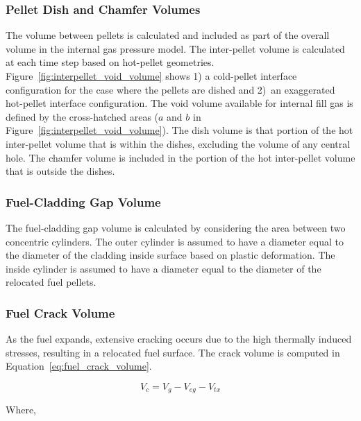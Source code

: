 \subsubsection{Pellet Dish and Chamfer Volumes} \label{section:pellet-dish-and-chamfer-volumes}

The volume between pellets is calculated and included as part of the overall volume in the internal
gas pressure model. The inter-pellet volume is calculated at each time step based on hot-pellet
geometries.  Figure~\ref{fig:interpellet_void_volume} shows 1) a cold-pellet interface configuration
for the case where the pellets are dished and 2)~an exaggerated hot-pellet interface configuration.
The void volume available for internal fill gas is defined by the cross-hatched areas ($a$ and $b$
in Figure~\ref{fig:interpellet_void_volume}).  The dish volume is that portion of the hot
inter-pellet volume that is within the dishes, excluding the volume of any central hole. The chamfer
volume is included in the portion of the hot inter-pellet volume
that is outside the dishes.

\subsubsection{Fuel-Cladding Gap Volume} \label{section:fuel-cladding-gap-volume}

The fuel-cladding gap volume is calculated by considering the area between two concentric cylinders.
The outer cylinder is assumed to have a diameter equal to the diameter of the cladding inside
surface based on plastic deformation. The inside cylinder is assumed to have a diameter equal to the
diameter of the relocated fuel pellets.

\subsubsection{Fuel Crack Volume} \label{section:fuel-crack-volume}

As the fuel expands, extensive cracking occurs due to the high thermally
induced stresses, resulting in a relocated fuel surface. The crack
volume is computed in Equation~\ref{eq:fuel_crack_volume}.

\begin{equation}
    \label{eq:fuel_crack_volume}
    V_{c} = V_{g} - V_{eg} - V_{tx}
\end{equation}

Where,

